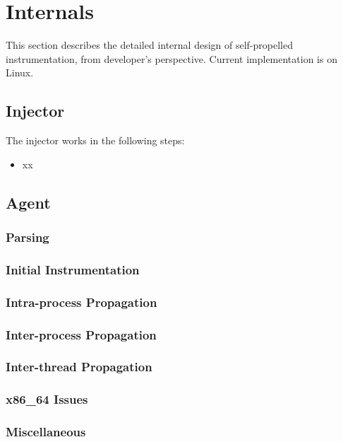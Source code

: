 \section{Internals}

This section describes the detailed internal design of self-propelled
instrumentation, from developer's perspective.
Current implementation is on Linux.

\subsection{Injector}

The injector works in the following steps:
\begin{itemize}
  \item xx
\end{itemize}

\subsection{Agent}
\subsubsection{Parsing}
\subsubsection{Initial Instrumentation}
\subsubsection{Intra-process Propagation} \label{sec:intrainst}
\subsubsection{Inter-process Propagation}
\subsubsection{Inter-thread Propagation}
\subsubsection{x86\_64 Issues}

\subsubsection{Miscellaneous}

